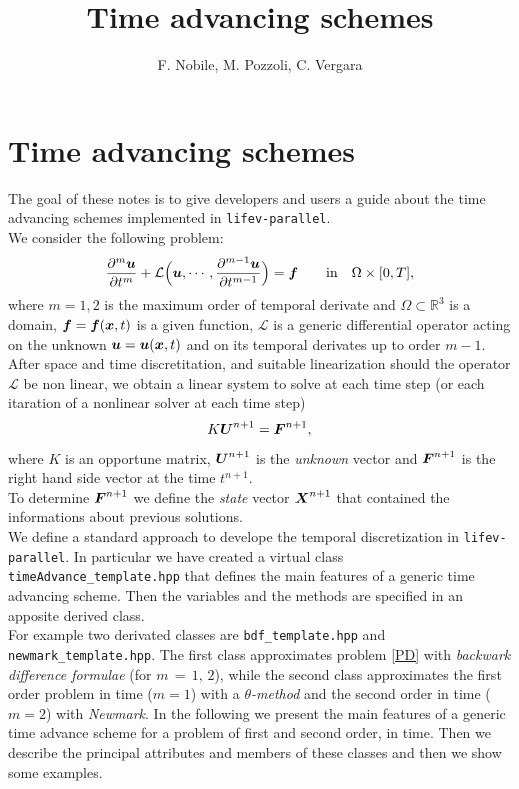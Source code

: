 \documentclass[english,a4paper]{article}
\title{Time advancing schemes}
\author{F. Nobile, M. Pozzoli, C. Vergara}
\date{}
\newcommand{\Xbf}{\text{\mbox{\boldmath $X$}}}
\newcommand{\ubf}{\text{\mbox{\boldmath $u$}}}
\newcommand{\xbf}{\text{\mbox{\boldmath $x$}}}
\newcommand{\Ubf}{\text{\mbox{\boldmath $U$}}}
\newcommand{\fbf}{\text{\mbox{\boldmath $f$}}}
\newcommand{\Fbf}{\text{\mbox{\boldmath $F$}}}
\newcommand{\xx}{\boldsymbol}
\begin{document}
\maketitle




\pagestyle{plain}

\tableofcontents

\newpage


\section{Time advancing schemes}
The goal of these notes is to give developers and users a guide about
the time advancing schemes implemented in \verb"lifev-parallel".\\
We consider the following problem:
 \begin{equation}\label{PD}
 \displaystyle\frac{\partial^m \ubf}{\partial t^m}+\mathcal{L} \Big(\ubf,\cdots,\displaystyle\frac{\partial^{m-1} \ubf}{\partial t^{m-1}} \Big)= \fbf\qquad \textrm{in}\quad\Omega\times [0, T], 
 \end{equation}
where $m = 1, 2$ is the maximum order of temporal derivate and
$\Omega\subset \mathbb{R}^3$  is a domain,
$\fbf=\fbf(\xbf,t)$ is a given function,  $\mathcal{L}$  is a generic differential
operator acting on the unknown  $\ubf=\ubf(\xbf,t)$ and on   its temporal
derivates up to order $m-1$.\\
After space and time discretitation, and suitable linearization should
the operator $\mathcal{L}$ be non linear, we obtain a linear system to solve at
each time step (or each itaration of a nonlinear solver at each time step)
 \begin{equation}\label{modello}
 K \xx U^{n+1}=\Fbf^{n+1},
 \end{equation}
where $K$  is an opportune matrix, $\Ubf^{n+1}$ is the {\sl unknown} vector 
 and $\Fbf^{n+1}$ is the right hand side vector at the time
 $t^{n+1}$. \\
To determine $\Fbf^{n+1}$ we define the {\sl state} vector $\Xbf^{n+1}$ that contained the
informations about previous solutions.\\
 We define a standard approach to develope the temporal discretization
 in \verb"lifev-parallel". In particular we have created a virtual class
 \verb"timeAdvance_template.hpp" that defines the main features of
 a generic time advancing scheme. Then  the  variables and the methods  are specified in an apposite derived class.\\
For example two derivated classes are \verb"bdf_template.hpp" and
\verb"newmark_template.hpp". The first class approximates  problem  \eqref{PD} with  {\sl backwark
  difference formulae} (for $m\,=\,1,\,2$), while the second class approximates the first order problem in time ($m=1$) with a {\sl$\theta$-method} and the second order in
time ($m=2$) with {\sl Newmark}.
In the following we present the main features of a generic time
advance scheme for a problem of first  and  second  order, in
time. 
Then we describe the principal attributes and members of these classes
and then we show some examples.
\end{document}
